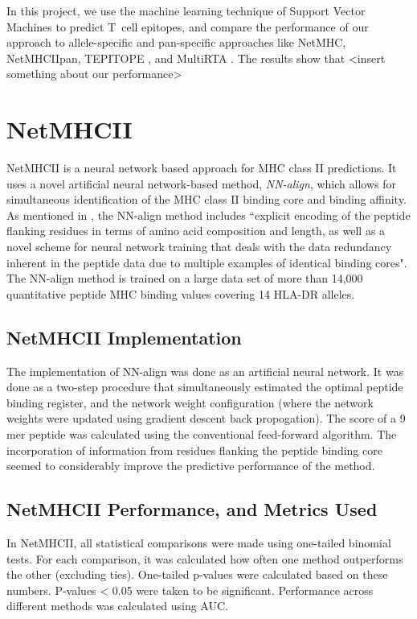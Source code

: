 \documentclass[journal]{IEEEtran}
\begin{document}
In this project, we use the machine learning technique of Support Vector Machines to predict T~cell epitopes, and compare the performance of our approach to allele-specific and pan-specific approaches like NetMHC, NetMHCIIpan, TEPITOPE \cite{TEPITOPE}, and MultiRTA \cite{MultiRTA}. The results show that <insert something about our performance>


\section{NetMHCII}
NetMHCII is a neural network based approach for MHC class II predictions. It uses a novel artificial neural network-based method, \textit{NN-align}, which allows for simultaneous identification of the MHC class II binding core and binding affinity. As mentioned in \cite{NetMHCII}, the NN-align method includes ``explicit encoding of the peptide flanking residues in terms of amino acid composition and length, as well as a novel scheme for neural network training that deals with the data redundancy inherent in the peptide data due to multiple examples of identical binding cores". The NN-align method is trained on a large data set of more than 14,000 quantitative peptide MHC binding values covering 14 HLA-DR alleles.

\subsection{NetMHCII Implementation}
The implementation of NN-align was done as an artificial neural network. It was done as a two-step procedure that simultaneously estimated the optimal peptide binding register, and the network weight configuration (where the network weights were updated using gradient descent back propogation). The score of a 9 mer peptide was calculated using the conventional feed-forward algorithm. The incorporation of information from residues flanking the peptide binding core seemed to considerably improve the predictive performance of the method. 



\subsection{NetMHCII Performance, and Metrics Used}
In NetMHCII, all statistical comparisons were made using one-tailed binomial tests. For each comparison, it was calculated how often one method outperforms the other (excluding ties). One-tailed p-values were calculated based on these numbers. P-values < 0.05 were taken to be significant. Performance across different methods was calculated using AUC.
\end{document}
